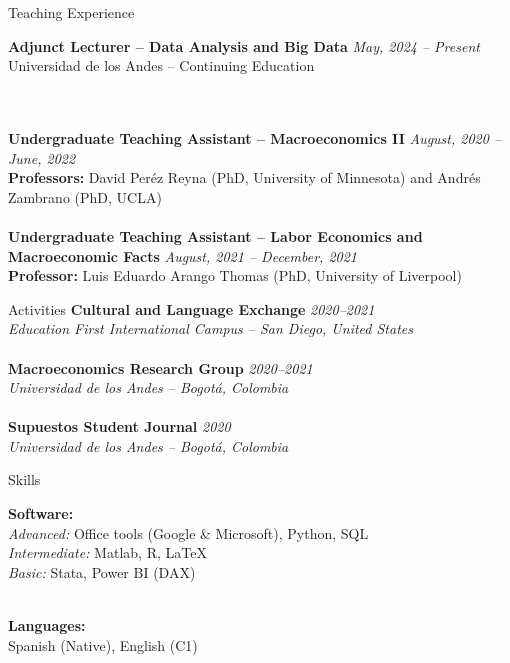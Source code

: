 \documentclass{resume}
\begin{document}


\begin{rSection}{Teaching Experience}

{\bf Adjunct Lecturer – Data Analysis and Big Data} \hfill {\em May, 2024 – Present} 
\\ Universidad de los Andes – Continuing Education

\\
\\
{\bf Undergraduate Teaching Assistant – Macroeconomics II} \hfill {\em August, 2020 – June, 2022} 
\\ \textbf{Professors:} David Peréz Reyna (PhD, University of Minnesota) and Andrés Zambrano (PhD, UCLA)
\\
\\
{\bf Undergraduate Teaching Assistant – Labor Economics and Macroeconomic Facts} \hfill {\em August, 2021 – December, 2021} 
\\ \textbf{Professor:} Luis Eduardo Arango Thomas (PhD, University of Liverpool)

\end{rSection}

\begin{rSection}{Activities} \itemsep -2pt
{\bf Cultural and Language Exchange} \hfill {\em 2020–2021} 
\\ \textit{Education First International Campus – San Diego, United States}
\\
\\
{\bf Macroeconomics Research Group} \hfill {\em 2020–2021} 
\\ \textit{Universidad de los Andes – Bogotá, Colombia}
\\
\\
{\bf Supuestos Student Journal} \hfill {\em 2020} 
\\ \textit{Universidad de los Andes – Bogotá, Colombia}
\end{rSection}

\begin{rSection}{Skills}

{\bf Software:}\\  \textit{Advanced:} Office tools (Google & Microsoft), Python, SQL
\\ \textit{Intermediate:} Matlab, R, \LaTeX
\\ \textit{Basic:} Stata, Power BI (DAX)

\\ {\bf Languages:} \\ Spanish (Native), English (C1)

\end{rSection}
\end{document}
